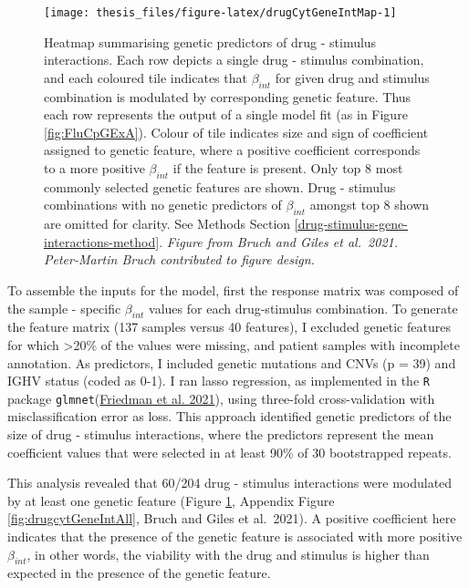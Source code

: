 \documentclass[11pt, a4paper, twosided]{book}
\begin{document}
\begin{figure}[hp]

{\centering \texttt{[image: thesis\_files/figure-latex/drugCytGeneIntMap-1]} 

}

\caption{Heatmap summarising genetic predictors of drug - stimulus interactions. Each row depicts a single drug - stimulus combination, and each coloured tile indicates that \(\beta_{int}\) for given drug and stimulus combination is modulated by corresponding genetic feature. Thus each row represents the output of a single model fit (as in Figure \ref{fig:FluCpGExA}). Colour of tile indicates size and sign of coefficient assigned to genetic feature, where a positive coefficient corresponds to a more positive \(\beta_{int}\) if the feature is present. Only top 8 most commonly selected genetic features are shown. Drug - stimulus combinations with no genetic predictors of \(\beta_{int}\) amongst top 8 shown are omitted for clarity. See Methods Section \ref{drug-stimulus-gene-interactions-method}. \emph{Figure from Bruch and Giles et al.~2021. Peter-Martin Bruch contributed to figure design.}}\label{fig:drugCytGeneIntMap}
\end{figure}
To assemble the inputs for the model, first the response matrix was composed of the sample - specific \(\beta_{int}\) values for each drug-stimulus combination. To generate the feature matrix (137 samples versus 40 features), I excluded genetic features for which \textgreater20\% of the values were missing, and patient samples with incomplete annotation. As predictors, I included genetic mutations and CNVs (p = 39) and IGHV status (coded as 0-1). I ran lasso regression, as implemented in the \texttt{R} package \texttt{glmnet}(\protect\hyperlink{ref-R-glmnet}{Friedman et al. 2021}), using three-fold cross-validation with misclassification error as loss. This approach identified genetic predictors of the size of drug - stimulus interactions, where the predictors represent the mean coefficient values that were selected in at least 90\% of 30 bootstrapped repeats.

This analysis revealed that 60/204 drug - stimulus interactions were modulated by at least one genetic feature (Figure \ref{fig:drugCytGeneIntMap}, Appendix Figure \ref{fig:drugcytGeneIntAll}, Bruch and Giles et al.~2021). A positive coefficient here indicates that the presence of the genetic feature is associated with more positive \(\beta_{int}\), in other words, the viability with the drug and stimulus is higher than expected in the presence of the genetic feature.
\end{document}
